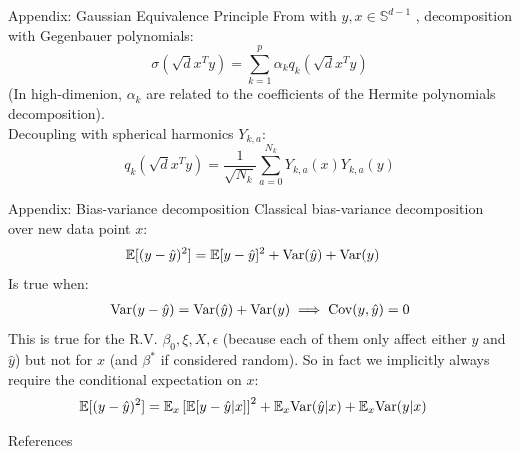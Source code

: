 \documentclass[10pt]{beamer}
\begin{document}
\begin{frame}{Appendix: Gaussian Equivalence Principle}
  From \cite{lu2022equivalence,mei2020generalization} with $y,x \in \mathbb S^{d-1}$ , decomposition with Gegenbauer polynomials:
  \begin{equation*}
    \sigma(\sqrt{d} x^T y) = \sum_{k=1}^{p} \alpha_k q_k(\sqrt{d} x^T y)
  \end{equation*}
  (In high-dimenion, $\alpha_k$ are related to the coefficients of the Hermite polynomials decomposition).\\
  Decoupling with spherical harmonics $Y_{k,a}$:
  \begin{equation*}
    q_k(\sqrt{d} x^T y) = \frac{1}{\sqrt{N_k}} \sum_{a=0}^{N_k} Y_{k,a}(x) Y_{k,a}(y)
  \end{equation*}
\end{frame}
  


\begin{frame}{Appendix: Bias-variance decomposition}
  Classical bias-variance decomposition over new data point $x$:
  \begin{align}
    \mathbb E[(y - \hat y )^2] & = \mathbb E[y - \hat y]^2 + \text{Var}(\hat y) + \text{Var}(y)
  \end{align}
  Is true when:
  \begin{align}
    \text{Var}(y - \hat y) = \text{Var}(\hat y) + \text{Var}(y)
    \implies \text{Cov}(y, \hat y)=0
  \end{align}
  This is true for the R.V. $\beta_0, \xi, X, \epsilon$ (because each of them only affect either $y$ and $\hat y$) but not for $x$ (and $\beta^*$ if considered random). So in fact we implicitly always require the conditional expectation on $x$:
  \begin{align}
    \mathbb E[(y - \hat y )^2] & = \mathbb E_x\left[ \mathbb E[y - \hat y| x]\right]^2 + \mathbb E_x \text{Var}(\hat y | x) + \mathbb E_x \text{Var}(y | x)
  \end{align}
\end{frame}




\appendix

\begin{frame}{References}

  
  

\end{frame}
\end{document}
